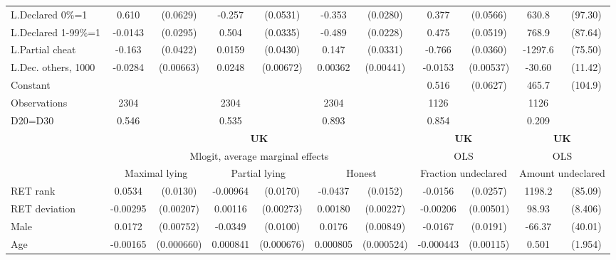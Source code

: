 \begin{tabular}{l|cccccc|cc|cc}
L.Declared 0\%=1&    0.610\sym{***}& (0.0629)&   -0.257\sym{***}& (0.0531)&   -0.353\sym{***}& (0.0280)&    0.377\sym{***}& (0.0566)&    630.8\sym{***}&  (97.30)\\
L.Declared 1-99\%=1&  -0.0143         & (0.0295)&    0.504\sym{***}& (0.0335)&   -0.489\sym{***}& (0.0228)&    0.475\sym{***}& (0.0519)&    768.9\sym{***}&  (87.64)\\
L.Partial cheat &   -0.163\sym{***}& (0.0422)&   0.0159         & (0.0430)&    0.147\sym{***}& (0.0331)&   -0.766\sym{***}& (0.0360)&  -1297.6\sym{***}&  (75.50)\\
L.Dec. others, 1000&  -0.0284\sym{***}&(0.00663)&   0.0248\sym{***}&(0.00672)&  0.00362         &(0.00441)&  -0.0153\sym{***}&(0.00537)&   -30.60\sym{***}&  (11.42)\\
Constant        &                  &         &                  &         &                  &         &    0.516\sym{***}& (0.0627)&    465.7\sym{***}&  (104.9)\\
\hline
Observations    &     2304         &         &     2304         &         &     2304         &         &     1126         &         &     1126         &         \\
D20=D30         &    0.546         &         &    0.535         &         &    0.893         &         &    0.854         &         &    0.209         &         \\
\hline\hline
&\multicolumn{6}{c|}{\bf UK}&\multicolumn{2}{c|}{\bf UK}&\multicolumn{2}{c}{\bf UK}\\ &\multicolumn{6}{c|}{Mlogit, average marginal effects }&\multicolumn{2}{c|}{OLS}&\multicolumn{2}{c}{OLS}\\
                &\multicolumn{2}{c}{Maximal lying}&\multicolumn{2}{c}{Partial lying}&\multicolumn{2}{c}{Honest}  &\multicolumn{2}{c}{Fraction undeclared}&\multicolumn{2}{c}{Amount undeclared}\\
\hline
RET rank        &   0.0534\sym{***}& (0.0130)& -0.00964         & (0.0170)&  -0.0437\sym{***}& (0.0152)&  -0.0156         & (0.0257)&   1198.2\sym{***}&  (85.09)\\
RET deviation   & -0.00295         &(0.00207)&  0.00116         &(0.00273)&  0.00180         &(0.00227)& -0.00206         &(0.00501)&    98.93\sym{***}&  (8.406)\\
Male            &   0.0172\sym{**} &(0.00752)&  -0.0349\sym{***}& (0.0100)&   0.0176\sym{**} &(0.00849)&  -0.0167         & (0.0191)&   -66.37\sym{*}  &  (40.01)\\
Age             & -0.00165\sym{**} &(0.000660)& 0.000841         &(0.000676)& 0.000805         &(0.000524)&-0.000443         &(0.00115)&    0.501         &  (1.954)\\

\end{tabular}
